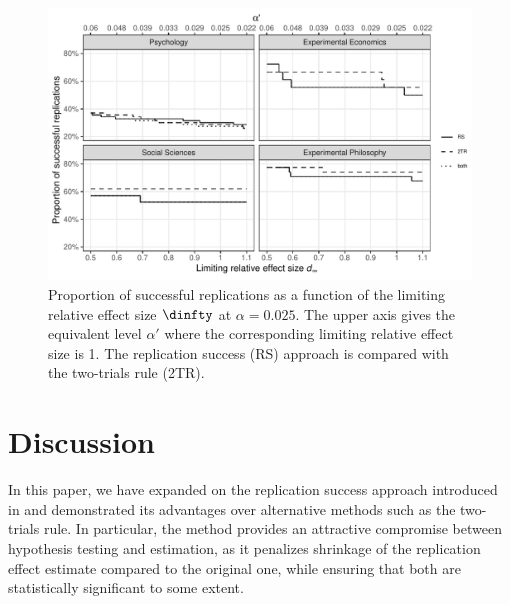 \begin{figure}[!htb]
\begin{knitrout}
\color{fgcolor}

{\centering \includegraphics[width=\maxwidth]{images/paper2/fig7-1}

}

\end{knitrout}
\caption{Proportion of successful replications as a function of the limiting
  relative effect size $\dinfty$ at $\alpha = 0.025$. The upper axis gives the
  equivalent level $\alpha'$ where the corresponding limiting relative effect
  size is 1. The replication success (RS) approach is compared with the
  two-trials rule (2TR).}
\label{fig2:fig7}
\end{figure}



\section{Discussion}\label{sec2:discussion}
In this paper, we have expanded on the replication success approach introduced
in \citet{Held2020} and demonstrated its advantages over alternative methods
such as the two-trials rule. In particular, the method provides an attractive
compromise between hypothesis testing and estimation,
as it penalizes
shrinkage of the replication effect estimate compared to the original one,
while ensuring that both are statistically significant to some extent.

